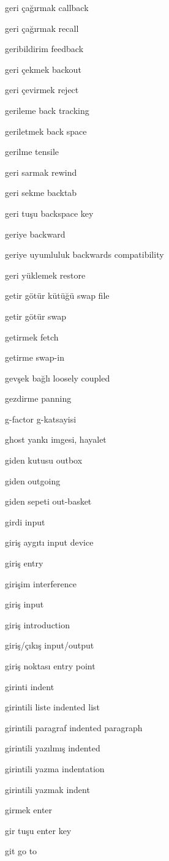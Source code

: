 \documentclass[12pt,fleqn]{article}\usepackage{../../common}
\begin{document}
geri çağırmak callback

geri çağırmak recall

geribildirim feedback

geri çekmek backout

geri çevirmek reject

gerileme back tracking

geriletmek back space

gerilme tensile

geri sarmak rewind

geri sekme backtab

geri tuşu backspace key

geriye backward

geriye uyumluluk backwards compatibility

geri yüklemek restore

getir götür kütüğü swap file

getir götür swap

getirmek fetch

getirme swap-in

gevşek bağlı loosely coupled

gezdirme panning

g-factor g-katsayisi

ghost yankı imgesi, hayalet

giden kutusu outbox

giden outgoing

giden sepeti out-basket

girdi input

giriş aygıtı input device

giriş entry

girişim interference

giriş input

giriş introduction

giriş/çıkış input/output

giriş noktası entry point

girinti indent

girintili liste indented list

girintili paragraf indented paragraph

girintili yazılmış indented

girintili yazma indentation

girintili yazmak indent

girmek enter

gir tuşu enter key

git go to
\end{document}
